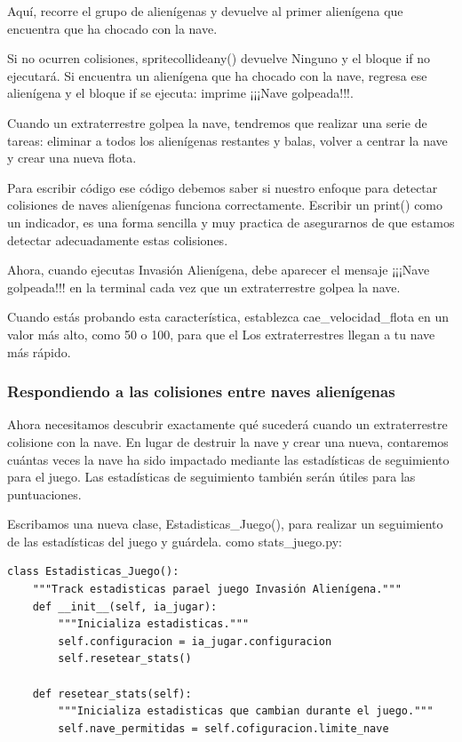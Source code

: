 Aquí, recorre el grupo de alienígenas y devuelve al primer alienígena que encuentra que ha chocado con la nave.


Si no ocurren colisiones, {\ttfamily spritecollideany()} devuelve Ninguno y el bloque {\ttfamily if } no ejecutará. 
Si encuentra un alienígena que ha chocado con la nave, regresa ese alienígena y el bloque {\ttfamily if } se ejecuta:
 imprime ¡¡¡Nave golpeada!!!. 
 
Cuando un extraterrestre golpea la nave, tendremos que realizar una serie de tareas:
eliminar a todos los alienígenas restantes y balas, volver a centrar la nave y crear una nueva flota. 


Para  escribir código ese código debemos saber si nuestro enfoque para detectar colisiones de naves alienígenas
funciona correctamente. Escribir un {\ttfamily print()} como un indicador, es una forma sencilla y muy practica de
asegurarnos de que estamos detectar adecuadamente estas colisiones.

Ahora, cuando ejecutas  Invasión Alienígena, debe aparecer  el mensaje  ¡¡¡Nave golpeada!!! 
en la terminal cada vez que un extraterrestre golpea la nave. 

Cuando estás probando esta característica, establezca  {\ttfamily cae\_velocidad\_flota}  en un valor más alto, como 50 o 100,
para que el Los extraterrestres llegan a tu nave más rápido.

\subsubsection{Respondiendo a las colisiones entre naves alienígenas}

Ahora necesitamos descubrir exactamente qué sucederá cuando un extraterrestre colisione con la nave.
En lugar de destruir la nave y crear una nueva, contaremos cuántas veces la nave ha sido impactado mediante las estadísticas
de seguimiento para el juego. Las estadísticas de seguimiento también serán útiles para las puntuaciones.

Escribamos una nueva clase,  {\ttfamily Estadisticas\_Juego()}, para realizar un seguimiento de las estadísticas del juego y guárdela.
como  {\ttfamily stats\_juego.py}:


\hspace{-2.4cm}{\ttfamily \scriptsize stats}

\vspace{-0.2cm}
\hspace{-2.1cm}{\ttfamily \scriptsize \_juego.py}\vspace{-0.84cm}
\begin{lstlisting}
class Estadisticas_Juego():
    """Track estadisticas parael juego Invasión Alienígena."""
    def __init__(self, ia_jugar):
        """Inicializa estadisticas."""
        self.configuracion = ia_jugar.configuracion
        self.resetear_stats()
   
    def resetear_stats(self):
        """Inicializa estadisticas que cambian durante el juego."""
        self.nave_permitidas = self.cofiguracion.limite_nave
\end{lstlisting}	



